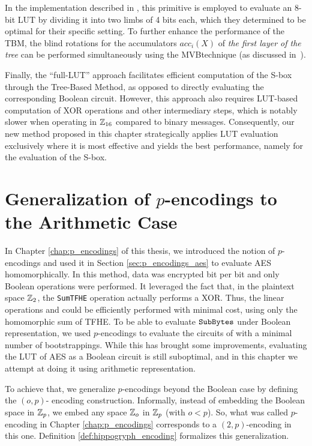 In the implementation described in \cite{DBLP:conf/wahc/TramaCBS23}, this primitive is employed to evaluate an 8-bit \gls{LUT} by dividing it into two limbs of 4 bits each, which they determined to be optimal for their specific setting. 
%
To further enhance the performance of the \gls{TBM}, the blind rotations for the accumulators $acc_i(X)$ of \emph{the first layer of the tree} can be performed simultaneously using the \gls{MVB}technique (as discussed in~\cite{TCHES:GuiBorAra21}). 

Finally, the ``full-\gls{LUT}'' approach facilitates efficient computation of the \gls{S-box} through the Tree-Based Method, as opposed to directly evaluating the corresponding Boolean circuit. However, this approach also requires \gls{LUT}-based computation of XOR operations and other intermediary steps, which is notably slower when operating in $\mathbb{Z}_{16}$ compared to binary messages. Consequently, our new method \hippo{} proposed in this chapter strategically applies \gls{LUT} evaluation exclusively where it is most effective and yields the best performance, namely for the evaluation of the \gls{S-box}.




\section{Generalization of $p$-encodings to the Arithmetic Case}
\label{sec:generalization_p_encodings}

In Chapter \ref{chap:p_encodings} of this thesis, we introduced the notion of $p$-encodings and used it in Section \ref{sec:p_encodings_aes} to evaluate \gls{AES} homomorphically. In this method, data was encrypted bit per bit and only Boolean operations were performed. It leveraged the fact that, in the plaintext space $\mathbb{Z}_2$, the \texttt{SumTFHE} operation actually performs a XOR. Thus, the linear operations \MixColumns and \AddRoundKey could be efficiently performed with minimal cost, using only the homomorphic sum of \gls{TFHE}. To be able to evaluate $\texttt{SubBytes}$ under Boolean representation, we used $p$-encodings to evaluate the circuits of \SubBytes with a minimal number of bootstrappings. While this has brought some improvements, evaluating the \gls{LUT} of \gls{AES} as a Boolean circuit is still suboptimal, and in this chapter we attempt at doing it using arithmetic representation.

To achieve that, we generalize $p$-encodings beyond the Boolean case by defining the $(o, p)$- encoding construction. Informally, instead of embedding the Boolean space in $\mathbb{Z}_p$, we embed any space $\mathbb{Z}_o$ in $\mathbb{Z}_p$ (with $o < p$). So, what was called $p$-encoding in Chapter \ref{chap:p_encodings} corresponds to a $(2, p)$-encoding in this one.
%
Definition \ref{def:hippogryph_encoding} formalizes this generalization.

